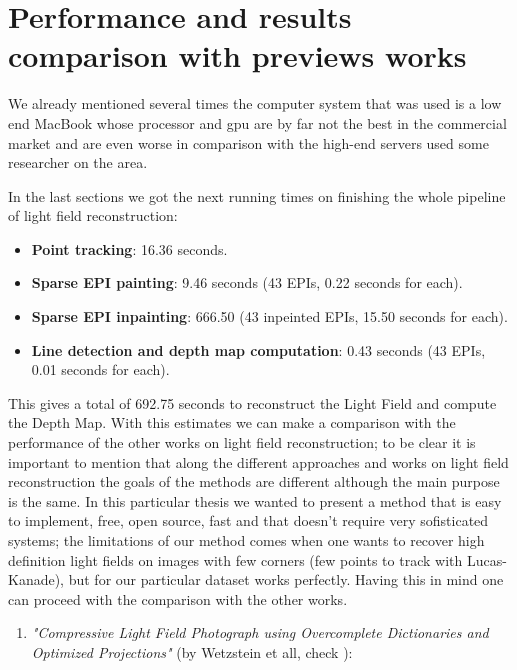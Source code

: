 \section{Performance and results comparison with previews works}

We already mentioned several times the computer system that was used is a low end MacBook whose processor and gpu are by far not the best in the commercial market and are even worse in comparison with the high-end servers used some researcher on the area. 

\bigskip

In the last sections we got the next running times on finishing the whole pipeline of light field reconstruction:

\begin{itemize}
\item \textbf{Point tracking}: 16.36 seconds.
\item \textbf{Sparse EPI painting}: 9.46 seconds (43 EPIs, 0.22 seconds for each).
\item \textbf{Sparse EPI inpainting}: 666.50 (43 inpeinted EPIs, 15.50 seconds for each).
\item \textbf{Line detection and depth map computation}: 0.43 seconds (43 EPIs, 0.01 seconds for each).
\end{itemize}

This gives a total of 692.75 seconds to reconstruct the Light Field and compute the Depth Map. With this estimates we can make a comparison with the performance of the other works on light field reconstruction; to be clear it is important to mention that along the different approaches and works on light field reconstruction the goals of the methods are different although the main purpose is the same. In this particular thesis we wanted to present a method that is easy to implement, free, open source, fast and that doesn't require very sofisticated systems; the limitations of our method comes when one wants to recover high definition light fields on images with few corners (few points to track with Lucas-Kanade), but for our particular dataset works perfectly. Having this in mind one can proceed with the comparison with the other works.

\begin{enumerate}
\item \textit{"Compressive Light Field Photograph using Overcomplete Dictionaries and Optimized Projections"} (by Wetzstein et all, check \cite{CompressedMIT}):  
\end{enumerate}
